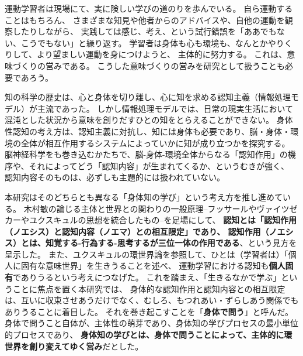 運動学習者は現場にて、実に険しい学びの道のりを歩んでいる。
自ら運動することはもちろん、
さまざまな知見や他者からのアドバイスや、自他の運動を観察したりしながら、
実践しては感じ、考え、という試行錯誤を「ああでもない、こうでもない」と繰り返す。
学習者は身体も心も環境も、なんとかやりくりして、より望ましい運動を身につけようと、
主体的に努力する。
これは、意味づくりの営みである。
こうした意味づくりの営みを研究として扱うことも必要であろう。

知の科学の歴史は、心と身体を切り離し、心に知を求める認知主義（情報処理モデル）が主流であった。
しかし情報処理モデルでは、日常の現実生活において混沌とした状況から意味を創りだすひとの知をとらえることができない。
身体性認知の考え方は、認知主義に対抗し、知には身体も必要であり、脳・身体・環境の全体が相互作用するシステムによっていかに知が成り立つかを探究する。
脳神経科学をも巻き込むかたちで、脳-身体-環境全体からなる「認知作用」の機序や、それによってどう「認知内容」が生まれてくるか、というむきが強く、
認知内容そのものは、必ずしも主題的には扱われていない。

本研究はそのどちらとも異なる「身体知の学び」という考え方を推し進めている。
木村敏の論じる主体と世界との関わりの一般原理--フッサールやヴァイツゼカーやユクスキュルの思想を統合したもの--を足場にして、
\textbf{認知とは「認知作用（ノエシス）と認知内容（ノエマ）との相互限定」であり、
認知作用（ノエシス）とは、知覚する-行為する-思考するが三位一体の作用である}、という見方を呈示した。
また、ユクスキュルの環世界論を参照して、ひとは（学習者は）「個人に固有な意味世界」を生きうることを述べ、
運動学習における認知も\textbf{個人固有}でありうるという考えにつなげた。
これを踏まえ、「生きるなかで学ぶ」ということに焦点を置く本研究では、
身体的な認知作用と認知内容との相互限定は、互いに収束させあうだけでなく、むしろ、もつれあい・ずらしあう関係でもありうることに着目した。
それを巻き起こすことを「\textbf{身体で問う}」と呼んだ。
身体で問うこと自体が、主体性の萌芽であり、身体知の学びプロセスの最小単位的プロセスであり、
\textbf{身体知の学びとは、身体で問うことによって、主体的に環世界を創り変えてゆく営み}だとした。

